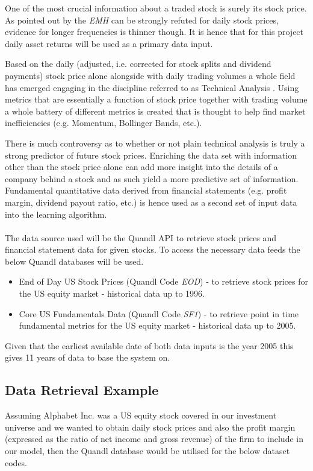 \documentclass[dvips,12pt]{article}
\begin{document}
One of the most crucial information about a traded stock is surely its stock price. As pointed out by \cite{sewell2012} the \emph{EMH} can be strongly refuted for daily stock prices, evidence for longer frequencies is thinner though. It is hence that for this project daily asset returns will be used as a primary data input.

Based on the daily (adjusted, i.e. corrected for stock splits and dividend payments) stock price alone alongside with daily trading volumes a whole field has emerged engaging in the discipline referred to as Technical Analysis \cite{murphy1998}. Using metrics that are essentially a function of stock price together with trading volume a whole battery of different metrics is created that is thought to help find market inefficiencies (e.g. Momentum, Bollinger Bands, etc.). 

There is much controversy as to whether or not plain technical analysis is truly a strong predictor of future stock prices. Enriching the data set with information other than the stock price alone can add more insight into the details of a company behind a stock and as such yield a more predictive set of information. Fundamental quantitative data derived from financial statements (e.g. profit margin, dividend payout ratio, etc.) is hence used as a second set of input data into the learning algorithm.
\\\\
The data source used will be the Quandl API to retrieve stock prices and financial statement data for given stocks.
To access the necessary data feeds the below Quandl databases will be used.

\begin{itemize}
	\item End of Day US Stock Prices (Quandl Code \emph{EOD}) - to retrieve stock prices for the US equity market - historical data up to 1996.
	\item Core US Fundamentals Data (Quandl Code \emph{SF1}) - to retrieve point in time fundamental metrics for the US equity market - historical data up to 2005.
\end{itemize}

Given that the earliest available date of both data inputs is the year 2005 this gives 11 years of data to base the system on.

\subsection*{Data Retrieval Example}
Assuming Alphabet Inc. was a US equity stock covered in our investment universe and we wanted to obtain daily stock prices and also the profit margin (expressed as the ratio of net income and gross revenue) of the firm to include in our model, then the Quandl database would be utilised for the below dataset codes.
\end{document}

